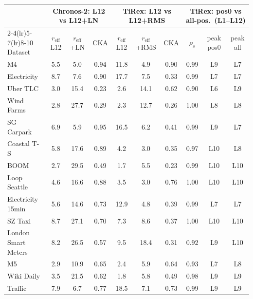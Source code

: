 \begin{tabular}{l ccc ccc ccc}
\toprule
 & \multicolumn{3}{c}{Chronos-2: L12 vs L12+LN} & \multicolumn{3}{c}{TiRex: L12 vs L12+RMS} & \multicolumn{3}{c}{TiRex: pos0 vs all-pos.\ (L1--L12)} \\
\cmidrule(lr){2-4}\cmidrule(lr){5-7}\cmidrule(lr){8-10}
Dataset & $r_{\mathrm{eff}}$ L12 & $r_{\mathrm{eff}}$ +LN & CKA & $r_{\mathrm{eff}}$ L12 & $r_{\mathrm{eff}}$ +RMS & CKA & $\rho_s$ & peak pos0 & peak all \\
\midrule
M4 & 5.5 & 5.0 & 0.94 & 11.8 & 4.9 & 0.90 & 0.99 & L9 & L7 \\
Electricity & 8.7 & 7.6 & 0.90 & 17.7 & 7.5 & 0.33 & 0.99 & L7 & L7 \\
Uber TLC & 3.0 & 15.4 & 0.23 & 2.6 & 14.1 & 0.62 & 0.90 & L6 & L9 \\
Wind Farms & 2.8 & 27.7 & 0.29 & 2.3 & 12.7 & 0.26 & 1.00 & L8 & L8 \\
SG Carpark & 6.9 & 5.9 & 0.95 & 16.5 & 6.2 & 0.41 & 0.99 & L9 & L7 \\
Coastal T-S & 5.8 & 17.6 & 0.89 & 4.2 & 3.0 & 0.35 & 0.97 & L10 & L8 \\
BOOM & 2.7 & 29.5 & 0.49 & 1.7 & 5.5 & 0.23 & 0.99 & L10 & L10 \\
Loop Seattle & 4.6 & 16.6 & 0.88 & 3.5 & 3.0 & 0.76 & 1.00 & L10 & L10 \\
Electricity 15min & 5.6 & 14.6 & 0.73 & 12.9 & 4.8 & 0.39 & 0.99 & L7 & L7 \\
SZ Taxi & 8.7 & 27.1 & 0.70 & 7.3 & 8.6 & 0.37 & 1.00 & L10 & L10 \\
London Smart Meters & 8.2 & 26.5 & 0.57 & 9.5 & 18.4 & 0.31 & 0.92 & L9 & L10 \\
M5 & 2.9 & 10.9 & 0.65 & 2.4 & 5.9 & 0.64 & 0.93 & L7 & L8 \\
Wiki Daily & 3.5 & 21.5 & 0.62 & 1.8 & 5.8 & 0.49 & 0.98 & L9 & L9 \\
Traffic & 7.9 & 6.7 & 0.77 & 18.5 & 7.1 & 0.73 & 0.99 & L9 & L9 \\
\bottomrule
\end{tabular}
